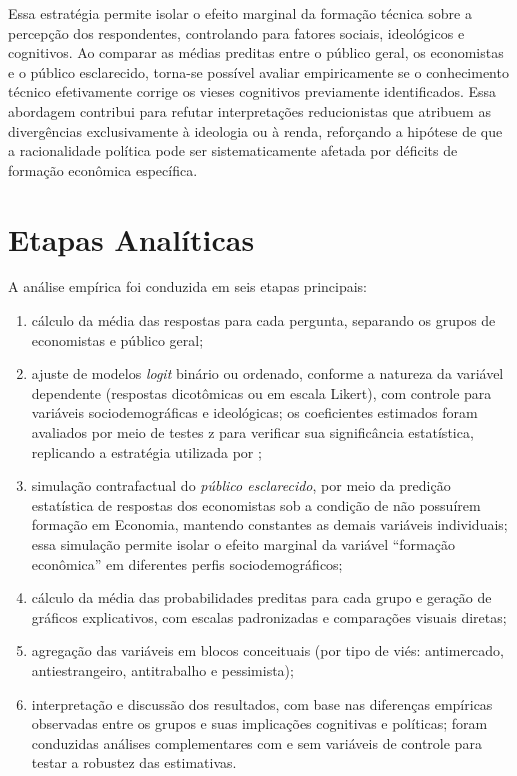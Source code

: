 \bigskip

Essa estratégia permite isolar o efeito marginal da formação técnica sobre a percepção dos respondentes, controlando para fatores sociais, ideológicos e cognitivos. Ao comparar as médias preditas entre o público geral, os economistas e o público esclarecido, torna-se possível avaliar empiricamente se o conhecimento técnico efetivamente corrige os vieses cognitivos previamente identificados. Essa abordagem contribui para refutar interpretações reducionistas que atribuem as divergências exclusivamente à ideologia ou à renda, reforçando a hipótese de que a racionalidade política pode ser sistematicamente afetada por déficits de formação econômica específica.


\section{Etapas Analíticas}

A análise empírica foi conduzida em seis etapas principais:

\begin{enumerate}[label=\alph*)]
    \item cálculo da média das respostas para cada pergunta, separando os grupos de economistas e público geral;
    
    \item ajuste de modelos \textit{logit} binário ou ordenado, conforme a natureza da variável dependente (respostas dicotômicas ou em escala Likert), com controle para variáveis sociodemográficas e ideológicas; os coeficientes estimados foram avaliados por meio de testes z para verificar sua significância estatística, replicando a estratégia utilizada por ;
    
    \item simulação contrafactual do \textit{público esclarecido}, por meio da predição estatística de respostas dos economistas sob a condição de não possuírem formação em Economia, mantendo constantes as demais variáveis individuais; essa simulação permite isolar o efeito marginal da variável ``formação econômica'' em diferentes perfis sociodemográficos;
    
    \item cálculo da média das probabilidades preditas para cada grupo e geração de gráficos explicativos, com escalas padronizadas e comparações visuais diretas;
    
    \item agregação das variáveis em blocos conceituais (por tipo de viés: antimercado, antiestrangeiro, antitrabalho e pessimista);
    
    \item interpretação e discussão dos resultados, com base nas diferenças empíricas observadas entre os grupos e suas implicações cognitivas e políticas; foram conduzidas análises complementares com e sem variáveis de controle para testar a robustez das estimativas.
\end{enumerate}

